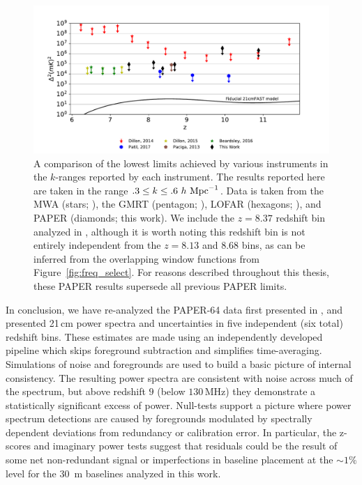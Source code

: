  \begin{figure}[tp]
\centering
\includegraphics[width=.95\textwidth]{plots/eor_lowest_limits.pdf}
\caption{A comparison of the lowest limits achieved by various instruments in the $k$-ranges reported by each instrument.
The results reported here are taken in the range
$.3 \leq k \leq .6\ h\ {\rm Mpc}^{-1}$. Data is taken
from the MWA (stars; \cite{dillon_et_al2013b,dillon_et_al2015,beardsley_et_al2016}),
the GMRT (pentagon; \cite{paciga_et_al2013}),
LOFAR (hexagons; \cite{patil_et_al2017}),
and PAPER (diamonds; this work).
We include the $z=8.37$ redshift bin analyzed in \citet{ali_et_al2015}, although
it is worth noting this redshift bin is not entirely independent
from the $z=8.13$ and $8.68$ bins, as can be inferred from the
overlapping window functions from Figure~\ref{fig:freq_select}.
For reasons described throughout this thesis,
these PAPER results supersede all previous PAPER limits.
\label{fig:eor_summary}}
\end{figure}

In conclusion, we have re-analyzed the PAPER-64 data first presented in ,
 and presented 21\,cm
power spectra and uncertainties in five independent (six total) redshift bins. These estimates
are made using an independently developed pipeline
which skips foreground subtraction and simplifies time-averaging. Simulations
of noise and foregrounds are used to build a basic picture of
internal consistency. The resulting power spectra are consistent with noise
across much of the spectrum, but above redshift $9$ (below $130$\,MHz) they demonstrate
a statistically significant excess of power. Null-tests support a picture where
power spectrum detections are caused by foregrounds modulated by
spectrally dependent deviations from redundancy or calibration error.
In particular, the z-scores and imaginary power tests suggest that residuals
could be the result of some net non-redundant signal
or imperfections in baseline placement at the
$ \sim 1\% $ level for the $ 30 $~m baselines
analyzed in this work.

